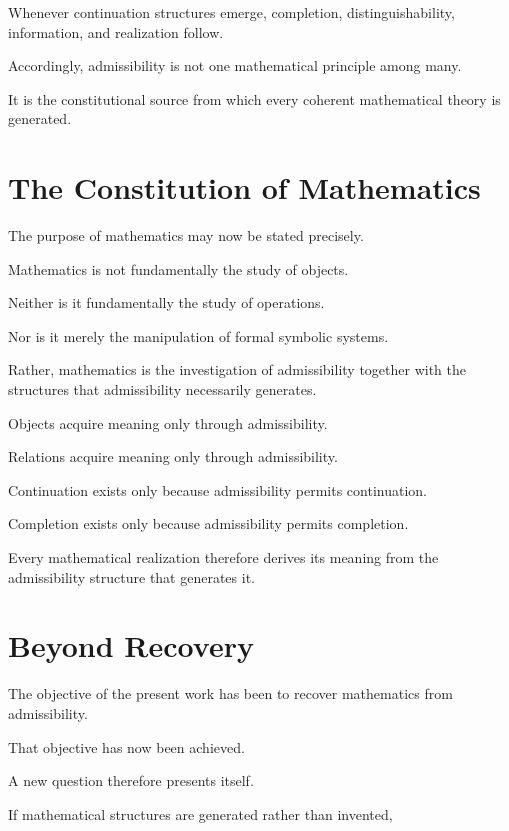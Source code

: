 \documentclass[13pt,openany]{book}
\theoremstyle{plain}
\theoremstyle{definition}
\begin{document}
Whenever continuation structures emerge, completion, distinguishability,
information, and realization follow.

Accordingly, admissibility is not one mathematical principle among many.

It is the constitutional source from which every coherent mathematical theory
is generated.

\section{The Constitution of Mathematics}

The purpose of mathematics may now be stated precisely.

Mathematics is not fundamentally the study of objects.

Neither is it fundamentally the study of operations.

Nor is it merely the manipulation of formal symbolic systems.

Rather, mathematics is the investigation of admissibility together with the
structures that admissibility necessarily generates.

Objects acquire meaning only through admissibility.

Relations acquire meaning only through admissibility.

Continuation exists only because admissibility permits continuation.

Completion exists only because admissibility permits completion.

Every mathematical realization therefore derives its meaning from the
admissibility structure that generates it.

\section{Beyond Recovery}

The objective of the present work has been to recover mathematics from
admissibility.

That objective has now been achieved.

A new question therefore presents itself.

If mathematical structures are generated rather than invented,
\end{document}
